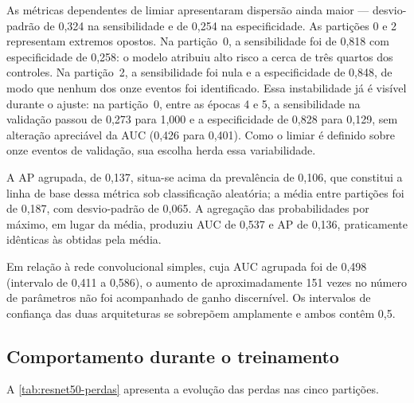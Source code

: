 As métricas dependentes de limiar apresentaram dispersão ainda maior ---
desvio-padrão de 0,324 na sensibilidade e de 0,254 na especificidade. As
partições 0 e 2 representam extremos opostos. Na partição~0, a sensibilidade
foi de 0,818 com especificidade de 0,258: o modelo atribuiu alto risco a cerca
de três quartos dos controles. Na partição~2, a sensibilidade foi nula e a
especificidade de 0,848, de modo que nenhum dos onze eventos foi identificado.
Essa instabilidade já é visível durante o ajuste: na partição~0, entre as
épocas 4 e 5, a sensibilidade na validação passou de 0,273 para 1,000 e a
especificidade de 0,828 para 0,129, sem alteração apreciável da \gls{AUC}
(0,426 para 0,401). Como o limiar é definido sobre onze eventos de validação,
sua escolha herda essa variabilidade.

A \gls{AP} agrupada, de 0,137, situa-se acima da prevalência de 0,106, que
constitui a linha de base dessa métrica sob classificação aleatória; a média
entre partições foi de 0,187, com desvio-padrão de 0,065. A agregação das
probabilidades por máximo, em lugar da média, produziu \gls{AUC} de 0,537 e
\gls{AP} de 0,136, praticamente idênticas às obtidas pela média.

Em relação à rede convolucional simples, cuja \gls{AUC} agrupada foi de 0,498
(intervalo de 0,411 a 0,586), o aumento de aproximadamente 151 vezes no número
de parâmetros não foi acompanhado de ganho discernível. Os intervalos de
confiança das duas arquiteturas se sobrepõem amplamente e ambos contêm 0,5.

\subsection{Comportamento durante o treinamento}
\label{subsec:treinamento-resnet50}

A \autoref{tab:resnet50-perdas} apresenta a evolução das perdas nas cinco
partições.

